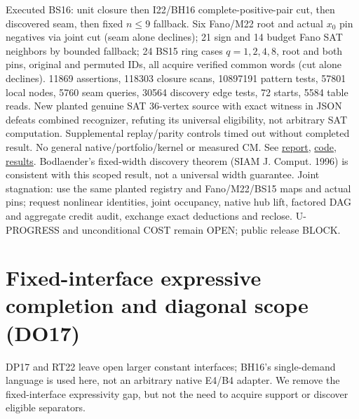 \documentclass[11pt]{article}
\begin{document}
Executed BS16: unit closure then I22/BH16 complete-positive-pair cut, then discovered seam, then fixed $n\le9$ fallback. Six Fano/M22 root and actual $x_0$ pin negatives via joint cut (seam alone declines); 21 sign and 14 budget Fano SAT neighbors by bounded fallback; 24 BS15 ring cases $q=1,2,4,8$, root and both pins, original and permuted IDs, all acquire verified common words (cut alone declines). 11869 assertions, 118303 closure scans, 10897191 pattern tests, 57801 local nodes, 5760 seam queries, 30564 discovery edge tests, 72 starts, 5584 table reads. New planted genuine SAT 36-vertex source with exact witness in JSON defeats combined recognizer, refuting its universal eligibility, not arbitrary SAT computation. Supplemental replay/parity controls timed out without completed result. No general native/portfolio/kernel or measured CM. See \href{https://github.com/j15marti/pnp/commit/e0440704d03611a222bc93301f99b3b86d0cf427}{report}, \href{https://github.com/j15marti/pnp/commit/29f055dedc75001f3a0419e9e9ed9e0d61568606}{code}, \href{https://github.com/j15marti/pnp/commit/3d408f496ef04f94fe38b4a248d2c77b27c8dcc1}{results}. Bodlaender's fixed-width discovery theorem (SIAM J. Comput. 1996) is consistent with this scoped result, not a universal width guarantee. Joint stagnation: use the same planted registry and Fano/M22/BS15 maps and actual pins; request nonlinear identities, joint occupancy, native hub lift, factored DAG and aggregate credit audit, exchange exact deductions and reclose. U-PROGRESS and unconditional COST remain OPEN; public release BLOCK.


\section{Fixed-interface expressive completion and diagonal scope (DO17)}\label{sec:do17}
DP17 and RT22 leave open larger constant interfaces; BH16's single-demand language is used here, not an arbitrary native E4/B4 adapter. We remove the fixed-interface expressivity gap, but not the need to acquire support or discover eligible separators.
\end{document}
